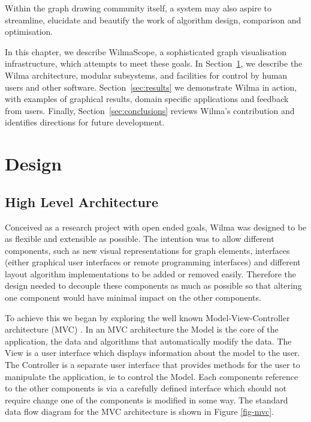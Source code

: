 \documentclass[runningheads]{cl2emult}
\begin{document}
Within the graph drawing community itself, a system may also aspire to 
streamline, elucidate and beautify the work of algorithm design, comparison
and optimisation.

In this chapter, we describe WilmaScope, a sophisticated graph visualisation
infrastructure, which attempts to meet these goals.  In
Section~\ref{sec:design}, we describe the Wilma architecture, modular
subsystems, and facilities for control by human users and other software.
Section~\ref{sec:results} we demonstrate Wilma in action, with examples of
graphical results, domain specific applications and feedback from users.
Finally, Section~\ref{sec:conclusions} reviews Wilma's contribution and
identifies directions for future development.

\section{Design}\label{sec:design}
\subsection{High Level Architecture}
Conceived as a research project with open ended goals, Wilma was
designed to be as flexible and extensible as possible.  The intention
was to allow different components, such as new visual representations
for graph elements, interfaces (either graphical user interfaces or
remote programming interfaces) and different 
layout algorithm implementations to be added or removed easily.
Therefore the design needed to decouple these components as much as
possible so that altering one component would have minimal impact on
the other components.

To achieve this we began by exploring the well known Model-View-Controller
architecture (MVC) \cite{gamma94design}.  In an MVC architecture the Model is the core
of the application, the data and algorithms that automatically modify
the data.  The View is a user interface which displays information
about the model to the user.  The Controller is a separate user
interface that provides methods for the user to manipulate the
application, ie to control the Model.  Each components reference to
the other components is via a carefully defined interface which should
not require change one of the components is modified in some way.  The
standard data flow diagram for the MVC architecture is shown in Figure
\ref{fig-mvc}.
\end{document}

